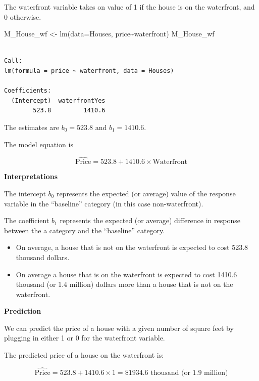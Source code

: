 \documentclass[
  letterpaper,
  DIV=11,
  numbers=noendperiod]{scrreprt}
\newenvironment{Shaded}{\begin{snugshade}}{\end{snugshade}}
\newcommand{\AttributeTok}[1]{\textcolor[rgb]{0.40,0.45,0.13}{#1}}
\newcommand{\FunctionTok}[1]{\textcolor[rgb]{0.28,0.35,0.67}{#1}}
\newcommand{\NormalTok}[1]{\textcolor[rgb]{0.00,0.23,0.31}{#1}}
\newcommand{\OtherTok}[1]{\textcolor[rgb]{0.00,0.23,0.31}{#1}}
\newcommand{\SpecialCharTok}[1]{\textcolor[rgb]{0.37,0.37,0.37}{#1}}
\begin{document}
The waterfront variable takes on value of 1 if the house is on the
waterfront, and 0 otherwise.

\begin{Shaded}
\begin{Highlighting}[]
\NormalTok{M\_House\_wf }\OtherTok{\textless{}{-}} \FunctionTok{lm}\NormalTok{(}\AttributeTok{data=}\NormalTok{Houses, price}\SpecialCharTok{\textasciitilde{}}\NormalTok{waterfront)}
\NormalTok{M\_House\_wf}
\end{Highlighting}
\end{Shaded}

\begin{verbatim}

Call:
lm(formula = price ~ waterfront, data = Houses)

Coefficients:
  (Intercept)  waterfrontYes  
        523.8         1410.6  
\end{verbatim}

The estimates are \(b_0=523.8\) and \(b_1=1410.6\).

The model equation is

\[
\widehat{\text{Price}} = 523.8 + 1410.6\times \text{Waterfront}
\]

\textbf{Interpretations}

The intercept \(b_0\) represents the expected (or average) value of the
response variable in the ``baseline'' category (in this case
non-waterfront).

The coefficient \(b_1\) represents the expected (or average) difference
in response between the a category and the ``baseline'' category.

\begin{itemize}
\item
  On average, a house that is not on the waterfront is expected to cost
  523.8 thousand dollars.
\item
  On average a house that is on the waterfront is expected to cost
  1410.6 thousand (or 1.4 million) dollars more than a house that is not
  on the waterfront.
\end{itemize}

\textbf{Prediction}

We can predict the price of a house with a given number of square feet
by plugging in either 1 or 0 for the waterfront variable.

The predicted price of a house on the waterfront is:

\[
\widehat{\text{Price}} = 523.8 + 1410.6\times 1 = \$1934.6{ \text{ thousand (or 1.9 million)}}
\]
\end{document}

